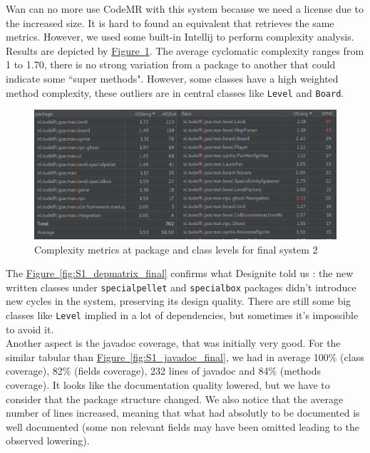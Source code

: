 \documentclass[]{article}
\newcommand{\wordlink}[2]{\hyperref[#2]{#1~\ref{#2}}}
\begin{document}
Wan can no more use CodeMR with this system because we need a license due to the increased size. It is hard to found an equivalent that retrieves the same metrics. However, we used some built-in Intellij to perform complexity analysis. Results are depicted by \wordlink{Figure}{fig:S1_compl_final}. The average cyclomatic complexity ranges from 1 to 1.70, there is no strong variation from a package to another that could indicate some ``super methods". However, some classes have a high weighted method complexity, these outliers are in central classes like \texttt{Level} and \texttt{Board}.\\

\begin{figure}[h]
\centering
\includegraphics[width=\linewidth]{S1-compl_final}
\caption{Complexity metrics at package and class levels for final system 2}
\label{fig:S1_compl_final}
\end{figure}

\vspace{0.8cm}

The \wordlink{Figure}{fig:S1_depmatrix_final} confirms what Designite told us : the new written classes under \texttt{specialpellet} and \texttt{specialbox} packages didn't introduce new cycles in the system, preserving its design quality. There are still some big classes like \texttt{Level} implied in a lot of dependencies, but sometimes it's impossible to avoid it. \\

Another aspect is the javadoc coverage, that was initially very good. For the similar tabular than \wordlink{Figure}{fig:S1_javadoc_final}, we had in average 100\% (class coverage), 82\% (fields coverage), 232 lines of javadoc and 84\% (methods coverage). It looks like the documentation quality lowered, but we have to consider that the package structure changed. We also notice that the average number of lines increased, meaning that what had absolutly to be documented is well documented (some non relevant fields may have been omitted leading to the observed lowering).
\end{document}
